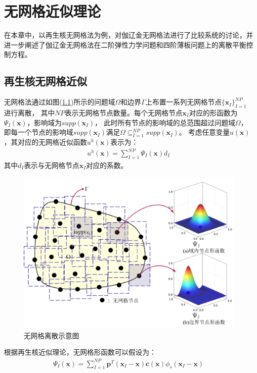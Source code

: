 \chapter{无网格近似理论}
在本章中，以再生核无网格法为例，对伽辽金无网格法进行了比较系统的讨论，并进一步阐述了伽辽金无网格法在二阶弹性力学问题和四阶薄板问题上的离散平衡控制方程。
\section{再生核无网格近似}
无网格法通过如图(\ref{nomeshpoint})所示的问题域$\Omega$和边界$\Gamma$上布置一系列无网格节点$\{\pmb{x}_I\}^{N\!P}_{I=1}$进行离散，
其中$N\!P$表示无网格节点数量。每个无网格节点$\pmb{x}_I$对应的形函数为$\Psi_I(\pmb{x})$，影响域为$supp(\pmb{x}_I)$，
此时所有节点的影响域的总范围超过问题域$\Omega$，即每一个节点的影响域$supp(\pmb{x}_I)$满足$\Omega\subseteq^{N\!P}_{I=1}supp(\pmb{x}_I)$。
考虑任意变量$u(\pmb{x})$，其对应的无网格近似函数$u^h(\pmb{x})$表示为：
\begin{equation}\label{ui}
\begin{split}
    u^h(\pmb{x})=\sum_{I=1}^{N\!P}\Psi_I(\pmb{x})d_{I}
\end{split}
\end{equation}
其中$d_{I}$表示与无网格节点$\pmb{x}_I$对应的系数。\par
\begin{figure}[H]
\centering
    \includegraphics[scale=0.6]{Figure/nomesh/point.png}
    \caption{无网格离散示意图}\label{nomeshpoint}
\end{figure}\par
根据再生核近似理论\cite{Liu}，无网格形函数可以假设为：
\begin{equation}\label{shapefunction}
\begin{split}
    \Psi_I(\pmb{x})=\sum_{I=1}^{N\!P}\pmb{p}^T(\pmb{x}_I-\pmb{x})\pmb{c}(\pmb{x})\phi_s(\pmb{x}_I-\pmb{x})
\end{split}
\end{equation}
